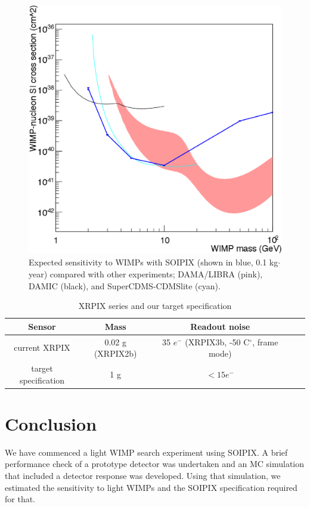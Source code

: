 \documentclass[12pt]{article}
\begin{document}
\begin{figure}[htb]
\centering
\includegraphics[height=9 cm]{sensitivity.eps}
\caption{Expected sensitivity to WIMPs with SOIPIX (shown in blue, 0.1 kg$\cdot$year) compared with other experiments; DAMA/LIBRA (pink), DAMIC (black), and SuperCDMS-CDMSlite (cyan). }
\label{fig:sensitivity}
\end{figure}



\begin{table}[h]
\begin{center}
\caption{XRPIX series and our target specification}
\begin{tabular}{c|cccc}  \hline
     Sensor         & Mass  & Readout noise \\ \hline
 current XRPIX  &   0.02 g (XRPIX2b) &   35 $e^-$ (XRPIX3b, -50 C$^\circ$, frame mode)\cite{Takeda:JINST}\\
 target specification	 &  1 g     &    $< 15 e^-$ \\ \hline
\end{tabular}
\label{tab:spec}
\end{center}
\end{table}


\section{Conclusion}
We  have commenced a light WIMP search experiment using SOIPIX.  A brief performance check of a prototype detector was undertaken and an MC simulation that included a detector response was developed.  Using that simulation, we estimated the sensitivity to light WIMPs and the SOIPIX specification required for that.
\end{document}
